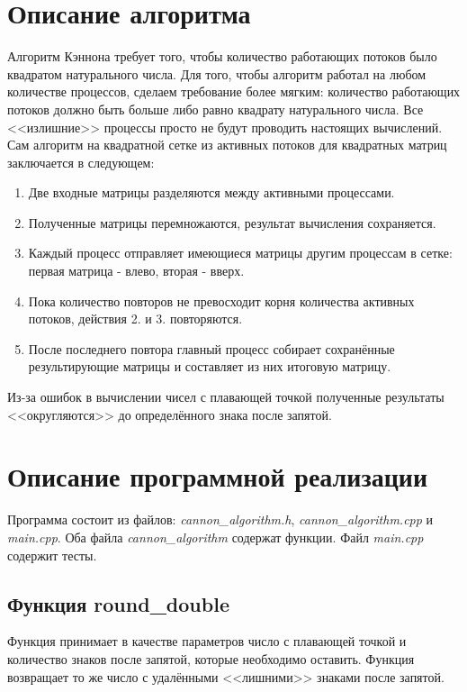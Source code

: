 \documentclass{report}
\begin{document}
\section*{Описание алгоритма}
\par Алгоритм Кэннона требует того, чтобы количество работающих потоков было квадратом натурального числа. Для того, чтобы алгоритм работал на любом количестве процессов, сделаем требование более мягким: количество работающих потоков должно быть больше либо равно квадрату натурального числа. Все <<излишние>> процессы просто не будут проводить настоящих вычислений. Сам алгоритм на квадратной сетке из активных потоков для квадратных матриц заключается в следующем:
\begin{enumerate}
    \item Две входные матрицы разделяются между активными процессами.
    \item Полученные матрицы перемножаются, результат вычисления сохраняется.
    \item Каждый процесс отправляет имеющиеся матрицы другим процессам в сетке: первая матрица - влево, вторая - вверх.
    \item Пока количество повторов не превосходит корня количества активных потоков, действия 2. и 3. повторяются.
    \item После последнего повтора главный процесс собирает сохранённые результирующие матрицы и составляет из них итоговую матрицу.
\end{enumerate}
\par Из-за ошибок в вычислении чисел с плавающей точкой полученные результаты <<округляются>> до определённого знака после запятой.
\newpage

\section*{Описание программной реализации}
\par Программа состоит из файлов: \emph{cannon\_algorithm.h}, \emph{cannon\_algorithm.cpp} и \emph{main.cpp}. Оба файла \emph{cannon\_algorithm} содержат функции. Файл \emph{main.cpp} содержит тесты.
\subsection*{Функция round\_double} 
\par Функция принимает в качестве параметров число с плавающей точкой и количество знаков после запятой, которые необходимо оставить. Функция возвращает то же число с удалёнными <<лишними>> знаками после запятой.
\end{document}

